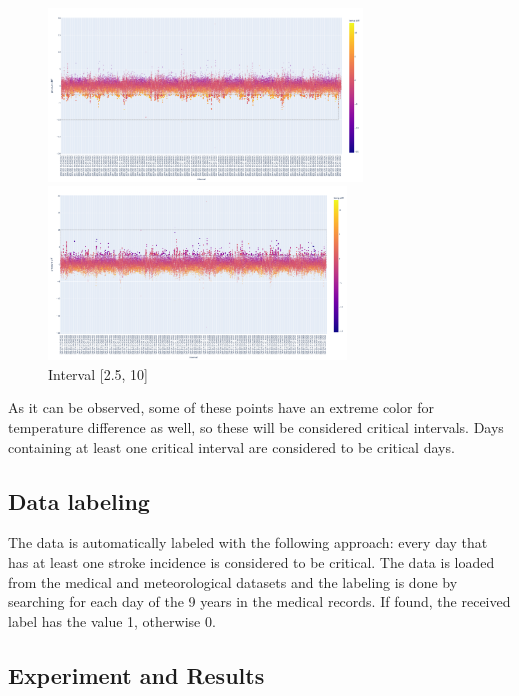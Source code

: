 \documentclass{article}
\begin{document}
\begin{figure}[h!] 
\begin{multicols}{2}

\centering
\includegraphics[height=4.6cm]{newplot (3).png}
\caption{Interval [-10, -2.5]}
\label{interval1}

\centering
\includegraphics[height=4.6cm]{newplot (2).png}
\caption{Interval [2.5, 10]}
\label{interval2}

\end{multicols}
\end{figure}

As it can be observed, some of these points have an extreme color for temperature difference as well, so these will be considered critical intervals. Days containing at least one critical interval are considered to be critical days.

\subsection{Data labeling}

The data is automatically labeled with the following approach: every day that has at least one stroke incidence is considered to be critical. The data is loaded from the medical and meteorological datasets and the labeling is done by searching for each day of the 9 years in the medical records. If found, the received label has the value 1, otherwise 0.

\subsection{Experiment and Results}
\end{document}
